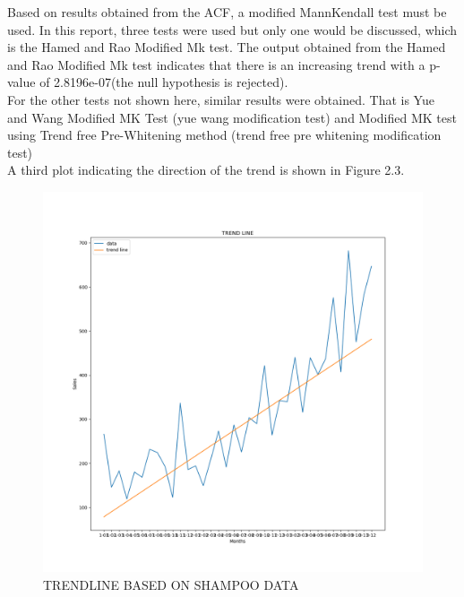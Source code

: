 \documentclass[12pt, letterpaper, twoside]{article}
\begin{document}
Based on results obtained from the ACF, a modified MannKendall test must be used. In this report, three tests were used but only one would be discussed, which is the Hamed and Rao Modified Mk test. 
The output obtained from the Hamed and Rao Modified Mk test indicates that there is an increasing trend with a p-value of 2.8196e-07(the null hypothesis is rejected).\\ For the other tests not shown here, similar results were obtained. That is Yue and Wang Modified MK Test (yue wang modification test) and Modified MK test using Trend free Pre-Whitening method (trend free pre whitening modification test)\\
A third plot indicating the direction of the trend is shown in Figure 2.3.\\
\begin{figure}[bp!]                                                                                                                                                                 \centering                                                                                                                                                                  \includegraphics[width=1\textwidth]{SHAMPOO_DATA_Trendline.png}
	                    \caption{TRENDLINE BASED ON SHAMPOO DATA}
			                            \label{fig:2.3}
\end{figure}
\end{document}
